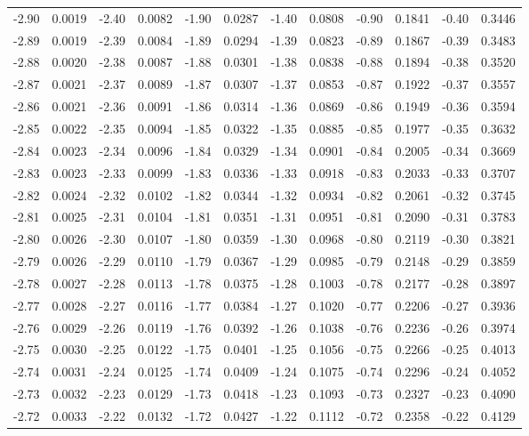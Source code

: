 \documentclass[12pt,letterpaper]{article}
\begin{document}
\begin{center}
\begin{tabular}{c c | c c | c c | c c | c c | c c}
-2.90 & 0.0019 & -2.40 & 0.0082 & -1.90 & 0.0287 & -1.40 & 0.0808 & -0.90 & 0.1841 & -0.40 & 0.3446 \\
-2.89 & 0.0019 & -2.39 & 0.0084 & -1.89 & 0.0294 & -1.39 & 0.0823 & -0.89 & 0.1867 & -0.39 & 0.3483 \\
-2.88 & 0.0020 & -2.38 & 0.0087 & -1.88 & 0.0301 & -1.38 & 0.0838 & -0.88 & 0.1894 & -0.38 & 0.3520 \\
-2.87 & 0.0021 & -2.37 & 0.0089 & -1.87 & 0.0307 & -1.37 & 0.0853 & -0.87 & 0.1922 & -0.37 & 0.3557 \\
-2.86 & 0.0021 & -2.36 & 0.0091 & -1.86 & 0.0314 & -1.36 & 0.0869 & -0.86 & 0.1949 & -0.36 & 0.3594 \\
-2.85 & 0.0022 & -2.35 & 0.0094 & -1.85 & 0.0322 & -1.35 & 0.0885 & -0.85 & 0.1977 & -0.35 & 0.3632 \\
-2.84 & 0.0023 & -2.34 & 0.0096 & -1.84 & 0.0329 & -1.34 & 0.0901 & -0.84 & 0.2005 & -0.34 & 0.3669 \\
-2.83 & 0.0023 & -2.33 & 0.0099 & -1.83 & 0.0336 & -1.33 & 0.0918 & -0.83 & 0.2033 & -0.33 & 0.3707 \\
-2.82 & 0.0024 & -2.32 & 0.0102 & -1.82 & 0.0344 & -1.32 & 0.0934 & -0.82 & 0.2061 & -0.32 & 0.3745 \\
-2.81 & 0.0025 & -2.31 & 0.0104 & -1.81 & 0.0351 & -1.31 & 0.0951 & -0.81 & 0.2090 & -0.31 & 0.3783 \\
-2.80 & 0.0026 & -2.30 & 0.0107 & -1.80 & 0.0359 & -1.30 & 0.0968 & -0.80 & 0.2119 & -0.30 & 0.3821 \\
-2.79 & 0.0026 & -2.29 & 0.0110 & -1.79 & 0.0367 & -1.29 & 0.0985 & -0.79 & 0.2148 & -0.29 & 0.3859 \\
-2.78 & 0.0027 & -2.28 & 0.0113 & -1.78 & 0.0375 & -1.28 & 0.1003 & -0.78 & 0.2177 & -0.28 & 0.3897 \\
-2.77 & 0.0028 & -2.27 & 0.0116 & -1.77 & 0.0384 & -1.27 & 0.1020 & -0.77 & 0.2206 & -0.27 & 0.3936 \\
-2.76 & 0.0029 & -2.26 & 0.0119 & -1.76 & 0.0392 & -1.26 & 0.1038 & -0.76 & 0.2236 & -0.26 & 0.3974 \\
-2.75 & 0.0030 & -2.25 & 0.0122 & -1.75 & 0.0401 & -1.25 & 0.1056 & -0.75 & 0.2266 & -0.25 & 0.4013 \\
-2.74 & 0.0031 & -2.24 & 0.0125 & -1.74 & 0.0409 & -1.24 & 0.1075 & -0.74 & 0.2296 & -0.24 & 0.4052 \\
-2.73 & 0.0032 & -2.23 & 0.0129 & -1.73 & 0.0418 & -1.23 & 0.1093 & -0.73 & 0.2327 & -0.23 & 0.4090 \\
-2.72 & 0.0033 & -2.22 & 0.0132 & -1.72 & 0.0427 & -1.22 & 0.1112 & -0.72 & 0.2358 & -0.22 & 0.4129 \\

\end{tabular}
\end{center}
\end{document}
